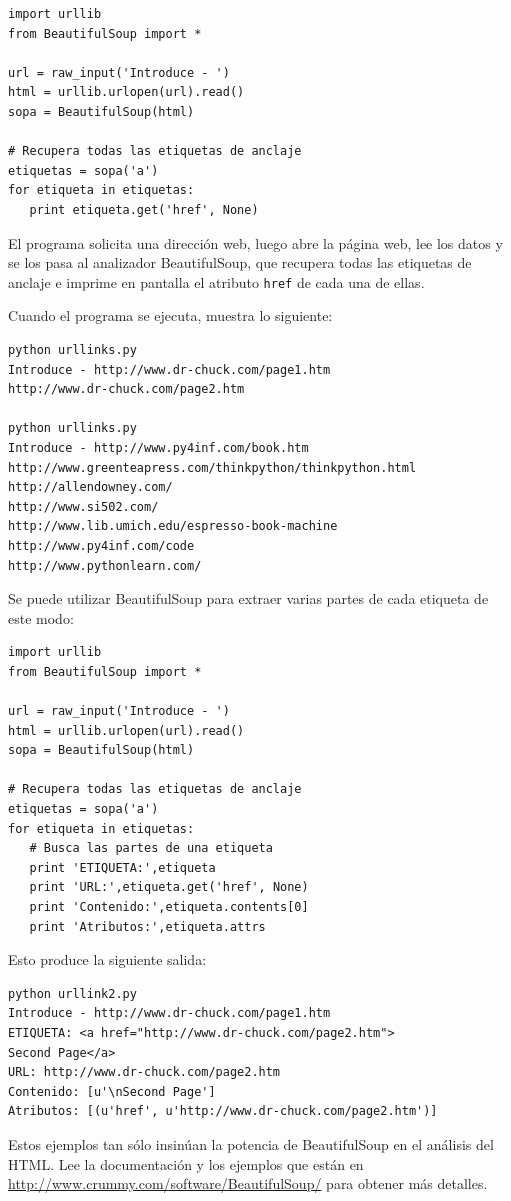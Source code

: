 \beforeverb
\begin{verbatim}
import urllib
from BeautifulSoup import *

url = raw_input('Introduce - ')
html = urllib.urlopen(url).read()
sopa = BeautifulSoup(html)

# Recupera todas las etiquetas de anclaje
etiquetas = sopa('a')
for etiqueta in etiquetas:
   print etiqueta.get('href', None)
\end{verbatim}
\afterverb
%
El programa solicita una dirección web, luego abre la página
web, lee los datos y se los pasa al analizador BeautifulSoup,
que recupera todas las etiquetas de anclaje e imprime en pantalla
el atributo {\tt href} de cada una de ellas.

Cuando el programa se ejecuta, muestra lo siguiente:

\beforeverb
\begin{verbatim}
python urllinks.py 
Introduce - http://www.dr-chuck.com/page1.htm
http://www.dr-chuck.com/page2.htm

python urllinks.py 
Introduce - http://www.py4inf.com/book.htm
http://www.greenteapress.com/thinkpython/thinkpython.html
http://allendowney.com/
http://www.si502.com/
http://www.lib.umich.edu/espresso-book-machine
http://www.py4inf.com/code
http://www.pythonlearn.com/
\end{verbatim}
\afterverb
%
Se puede utilizar BeautifulSoup para extraer varias partes de cada
etiqueta de este modo:

\beforeverb
\begin{verbatim}
import urllib
from BeautifulSoup import *

url = raw_input('Introduce - ')
html = urllib.urlopen(url).read()
sopa = BeautifulSoup(html)

# Recupera todas las etiquetas de anclaje
etiquetas = sopa('a')
for etiqueta in etiquetas:
   # Busca las partes de una etiqueta
   print 'ETIQUETA:',etiqueta
   print 'URL:',etiqueta.get('href', None)
   print 'Contenido:',etiqueta.contents[0]
   print 'Atributos:',etiqueta.attrs
\end{verbatim}
\afterverb
%
Esto produce la siguiente salida:

\beforeverb
\begin{verbatim}
python urllink2.py 
Introduce - http://www.dr-chuck.com/page1.htm
ETIQUETA: <a href="http://www.dr-chuck.com/page2.htm">
Second Page</a>
URL: http://www.dr-chuck.com/page2.htm
Contenido: [u'\nSecond Page']
Atributos: [(u'href', u'http://www.dr-chuck.com/page2.htm')]
\end{verbatim}
\afterverb
%
Estos ejemplos tan sólo insinúan la potencia de BeautifulSoup
en el análisis del HTML. Lee la documentación y
los ejemplos que están en
\url{http://www.crummy.com/software/BeautifulSoup/} para obtener más detalles.


